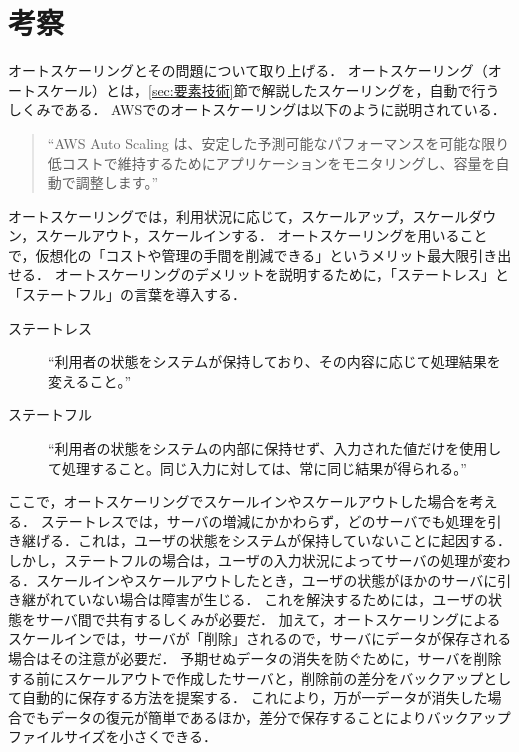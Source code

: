 \section{考察}
オートスケーリングとその問題について取り上げる．
オートスケーリング（オートスケール）とは，\ref{sec:要素技術}節で解説したスケーリングを，自動で行うしくみである．
AWSでのオートスケーリングは以下のように説明されている．
\begin{quote}
    ``AWS Auto Scaling は、安定した予測可能なパフォーマンスを可能な限り低コストで維持するためにアプリケーションをモニタリングし、容量を自動で調整します。''\hfill\cite{autoscaling}
\end{quote}
オートスケーリングでは，利用状況に応じて，スケールアップ，スケールダウン，スケールアウト，スケールインする．
オートスケーリングを用いることで，仮想化の「コストや管理の手間を削減できる」というメリット最大限引き出せる．
オートスケーリングのデメリットを説明するために，「ステートレス」と「ステートフル」の言葉を導入する．
\begin{description}
    \item[ステートレス] ``利用者の状態をシステムが保持しており、その内容に応じて処理結果を変えること。''
    \item[ステートフル] ``利用者の状態をシステムの内部に保持せず、入力された値だけを使用して処理すること。同じ入力に対しては、常に同じ結果が得られる。''
\end{description}
\begin{flushright}
    \cite[p.64]{IT用語図鑑}
\end{flushright}
ここで，オートスケーリングでスケールインやスケールアウトした場合を考える．
ステートレスでは，サーバの増減にかかわらず，どのサーバでも処理を引き継げる．これは，ユーザの状態をシステムが保持していないことに起因する．
しかし，ステートフルの場合は，ユーザの入力状況によってサーバの処理が変わる．スケールインやスケールアウトしたとき，ユーザの状態がほかのサーバに引き継がれていない場合は障害が生じる．
これを解決するためには，ユーザの状態をサーバ間で共有するしくみが必要だ．
加えて，オートスケーリングによるスケールインでは，サーバが「削除」されるので，サーバにデータが保存される場合はその注意が必要だ．
予期せぬデータの消失を防ぐために，サーバを削除する前にスケールアウトで作成したサーバと，削除前の差分をバックアップとして自動的に保存する方法を提案する．
これにより，万が一データが消失した場合でもデータの復元が簡単であるほか，差分で保存することによりバックアップファイルサイズを小さくできる．

